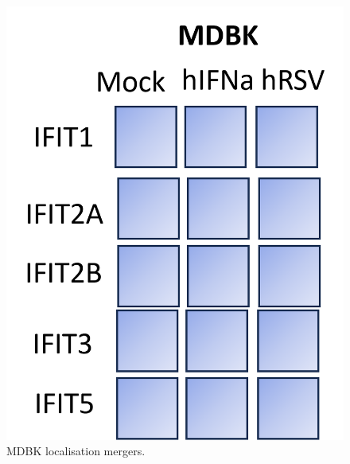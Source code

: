 \begin{figure}
    \centering
    \includegraphics[width=1\linewidth]{07. Chapter 2/Figs/04. Localisation/01. mdbk merges.png}
    \caption[MDBK localisation mergers.]{MDBK localisation mergers.}
    \label{MDBK localisation mergers.}
\end{figure}


